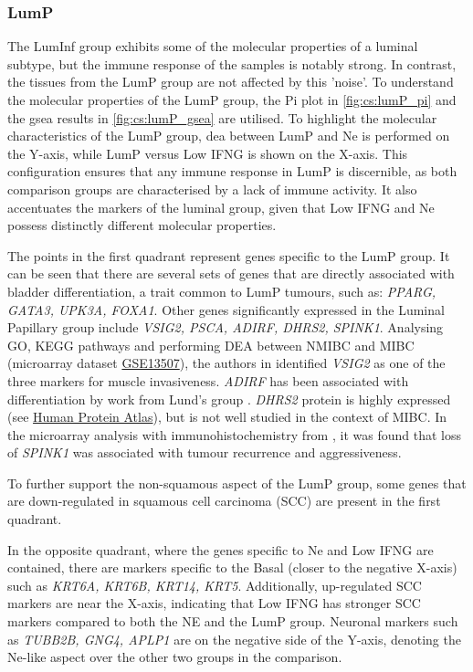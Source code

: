 \subsubsection{LumP} \label{s:cs:lumP_interp}

The LumInf group exhibits some of the molecular properties of a luminal subtype, but the immune response of the samples is notably strong. In contrast, the tissues from the LumP group are not affected by this 'noise'. To understand the molecular properties of the LumP group, the Pi plot in \cref{fig:cs:lumP_pi} and the \acrshort{gsea} results in \cref{fig:cs:lumP_gsea} are utilised. To highlight the molecular characteristics of the LumP group, \acrshort{dea} between LumP and Ne is performed on the Y-axis, while LumP versus Low IFNG is shown on the X-axis. This configuration ensures that any immune response in LumP is discernible, as both comparison groups are characterised by a lack of immune activity. It also accentuates the markers of the luminal group, given that Low IFNG and Ne possess distinctly different molecular properties.

The points in the first quadrant represent genes specific to the LumP group. It can be seen that there are several sets of genes that are directly associated with bladder differentiation, a trait common to LumP tumours, such as: \textit{PPARG, GATA3, UPK3A, FOXA1}. Other genes significantly expressed in the Luminal Papillary group include \textit{VSIG2, PSCA, ADIRF, DHRS2, SPINK1}. Analysing GO, KEGG pathways and performing DEA between NMIBC and MIBC (microarray dataset \href{https://www.ncbi.nlm.nih.gov/geo/query/acc.cgi?acc=GSE13507}{GSE13507}), the authors in \citet{He2021-de} identified \textit{VSIG2} as one of the three markers for muscle invasiveness. \textit{ADIRF} has been associated with differentiation by work from Lund's group \citet{Eriksson2015-lt}. \textit{DHRS2} protein is highly expressed (see \href{https://www.proteinatlas.org/ENSG00000100867-DHRS2/tissue/urinary+bladder}{Human Protein Atlas}), but is not well studied in the context of MIBC. In the microarray analysis with immunohistochemistry from \citet{Rink2013-sv}, it was found that loss of \textit{SPINK1} was associated with tumour recurrence and aggressiveness.

To further support the non-squamous aspect of the LumP group, some genes that are down-regulated in squamous cell carcinoma (SCC) \citet{Knowles2015-mu} are present in the first quadrant.

In the opposite quadrant, where the genes specific to Ne and Low IFNG are contained, there are markers specific to the Basal (closer to the negative X-axis) such as \textit{KRT6A, KRT6B, KRT14, KRT5}. Additionally, up-regulated SCC markers are near the X-axis, indicating that Low IFNG has stronger SCC markers compared to both the NE and the LumP group. Neuronal markers such as \textit{TUBB2B, GNG4, APLP1} are on the negative side of the Y-axis, denoting the Ne-like aspect over the other two groups in the comparison.

